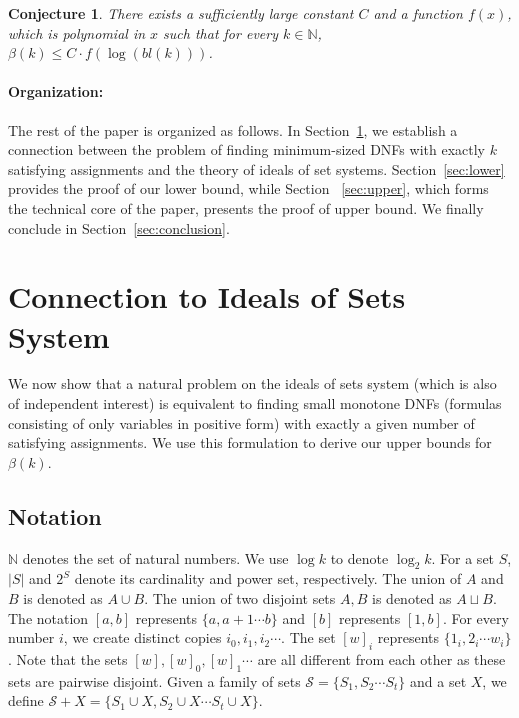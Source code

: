 \documentclass[11pt,a4paper]{article}
\newtheorem{conjecture}[theorem]{Conjecture}
\theoremstyle{definition}
\begin{document}
\begin{conjecture}
	There exists a sufficiently large constant $C$ and a function $f(x)$, 
	which is polynomial in $x$ such that for every $k\in \mathbb{N}$, 
	$\beta(k) \leq C \cdot f(\log{(bl(k))})$.
\end{conjecture}


\paragraph*{Organization:} The rest of the paper is organized as follows. In Section~\ref{sec:ideals}, we 
establish a connection between the problem of finding minimum-sized 
DNFs with exactly $k$ satisfying assignments and the theory of ideals 
of set systems. Section~\ref{sec:lower} provides the proof of our lower bound, while  Section ~\ref{sec:upper}, which forms the technical core of 
the paper, presents the proof of upper bound. We finally conclude in Section~\ref{sec:conclusion}. 








%

%
%
\section{Connection to Ideals of Sets System}\label{sec:ideals}
We now show that a natural problem on the ideals of sets 
system (which is also of independent interest) is equivalent 
to finding small monotone DNFs (formulas consisting of 
only variables in positive form) with exactly a given number 
of satisfying assignments. We use this formulation to 
derive our upper bounds for $\beta(k)$.

\subsection{Notation}
$\mathbb{N}$ denotes the set of natural numbers. We use 
$\log{k}$ to denote $\log_{2}{k}$. For a set $S$, $|{S}|$ 
and $2^{{S}}$ denote its cardinality and power set, 
respectively. The union of $A$ and $B$ is denoted as $A\cup B$. The union of two disjoint sets $A,B$ is denoted as $A \sqcup B$.  The notation $[a,b]$ represents 
$\{a,a+1\cdots b\}$ and $[b]$ represents $[1,b]$. 
For every number $i$, we create distinct copies 
$i_0,i_1,i_2\cdots$. The set $[w]_i$ represents 
$\{1_i,2_i\cdots w_i\}$. Note that the sets 
$[w],[w]_0,[w]_1\cdots$ are all different from each 
other as these sets are pairwise disjoint. Given a family of 
sets $\mathcal{S}=\{S_1,S_2\cdots S_t\}$ and a set $X$, we 
define $\mathcal{S}+X= \{S_1\cup X,S_2\cup X\cdots S_t\cup X\}$.
\end{document}
